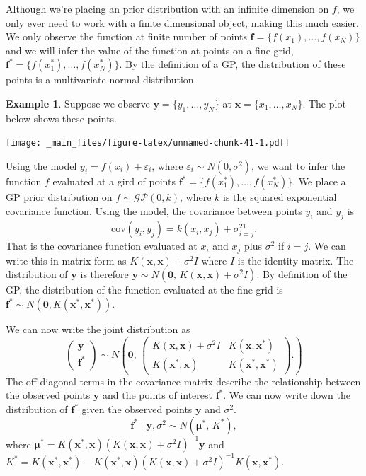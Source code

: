 \documentclass[
]{book}
\theoremstyle{definition}
\theoremstyle{definition}
\newtheorem{example}{Example}[chapter]
\theoremstyle{definition}
\theoremstyle{definition}
\theoremstyle{remark}
\begin{document}
Although we're placing an prior distribution with an infinite dimension on \(f\), we only ever need to work with a finite dimensional object, making this much easier. We only observe the function at finite number of points \(\boldsymbol{f} = \{f(x_1), \ldots, f(x_N)\}\) and we will infer the value of the function at points on a fine grid, \(\boldsymbol{f}^* = \{f(x_1^*), \ldots, f(x_N^*)\}\). By the definition of a GP, the distribution of these points is a multivariate normal distribution.

\begin{example}
Suppose we observe \(\boldsymbol{y} = \{y_1, \ldots, y_N\}\) at \(\boldsymbol{x} = \{x_1, \ldots, x_N\}\). The plot below shows these points.

\texttt{[image: \_main\_files/figure-latex/unnamed-chunk-41-1.pdf]}

Using the model \(y_i = f(x_i) + \varepsilon_i\), where \(\varepsilon_i \sim N(0, \sigma^2)\), we want to infer the function \(f\) evaluated at a gird of points \(\boldsymbol{f}^* = \{f(x_1^*), \ldots, f(x_N^*)\}\). We place a GP prior distribution on \(f \sim \mathcal{GP}(0, k)\), where \(k\) is the squared exponential covariance function. Using the model, the covariance between points \(y_i\) and \(y_j\) is
\[
\textrm{cov}(y_i, y_j) = k(x_i, x_j) + \sigma^21_{i=j}.
\]
That is the covariance function evaluated at \(x_i\) and \(x_j\) plus \(\sigma^2\) if \(i = j\). We can write this in matrix form as \(K(\boldsymbol{x}, \boldsymbol{x}) + \sigma^2I\) where \(I\) is the identity matrix. The distribution of \(\boldsymbol{y}\) is therefore \(\boldsymbol{y} \sim N(\boldsymbol{0}, \, K(\boldsymbol{x}, \boldsymbol{x}) + \sigma^2I)\). By definition of the GP, the distribution of the function evaluated at the fine grid is \(\boldsymbol{f}^* \sim N(\boldsymbol{0}, K(\boldsymbol{x}^*, \boldsymbol{x}^*))\).

We can now write the joint distribution as
\[
\begin{pmatrix}
\boldsymbol{y} \\
\boldsymbol{f}^*
\end{pmatrix} \sim N\left(\boldsymbol{0}, \,
\begin{pmatrix}
 K(\boldsymbol{x}, \boldsymbol{x}) + \sigma^2I &  K(\boldsymbol{x}, \boldsymbol{x}^*)\\
K(\boldsymbol{x}^*, \boldsymbol{x}) & K(\boldsymbol{x}^*, \boldsymbol{x}^*)
\end{pmatrix}.
\right)
\]
The off-diagonal terms in the covariance matrix describe the relationship between the observed points \(\boldsymbol{y}\) and the points of interest \(\boldsymbol{f}^*\). We can now write down the distribution of \(\boldsymbol{f}^*\) given the observed points \(\boldsymbol{y}\) and \(\sigma^2\).
\[
\boldsymbol{f}^* \mid \boldsymbol{y}, \sigma^2 \sim N(\boldsymbol{\mu}^*, \, K^*),
\]
where \(\boldsymbol{\mu}^* = K(\boldsymbol{x}^*, \boldsymbol{x})(K(\boldsymbol{x}, \boldsymbol{x}) + \sigma^2 I)^{-1} \boldsymbol{y}\) and \(K^* = K(\boldsymbol{x}^*, \boldsymbol{x}^*) - K(\boldsymbol{x}^*, \boldsymbol{x})(K(\boldsymbol{x}, \boldsymbol{x}) + \sigma^2I)^{-1}K(\boldsymbol{x}, \boldsymbol{x}^*)\).


\end{example}
\end{document}
